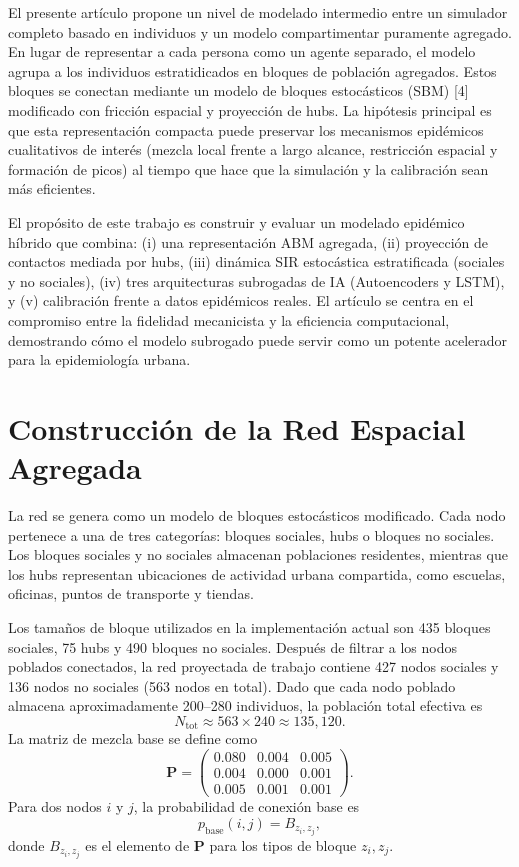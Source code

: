 \documentclass[12pt,a4paper,twocolumn]{article}
\begin{document}
El presente artículo propone un nivel de modelado intermedio entre un simulador completo basado en individuos y un modelo compartimentar puramente agregado. En lugar de representar a cada persona como un agente separado, el modelo agrupa a los individuos estratidicados en bloques de población agregados. Estos bloques se conectan mediante un modelo de bloques estocásticos (SBM) [4] modificado con fricción espacial y proyección de hubs. La hipótesis principal es que esta representación compacta puede preservar los mecanismos epidémicos cualitativos de interés (mezcla local frente a largo alcance, restricción espacial y formación de picos) al tiempo que hace que la simulación y la calibración sean más eficientes.

El propósito de este trabajo es construir y evaluar un modelado epidémico híbrido que combina: (i) una representación ABM agregada, (ii) proyección de contactos mediada por hubs, (iii) dinámica SIR estocástica estratificada (sociales y no sociales), (iv) tres arquitecturas subrogadas de IA (Autoencoders y LSTM), y (v) calibración frente a datos epidémicos reales. El artículo se centra en el compromiso entre la fidelidad mecanicista y la eficiencia computacional, demostrando cómo el modelo subrogado puede servir como un potente acelerador para la epidemiología urbana.

\section*{Construcción de la Red Espacial Agregada}

La red se genera como un modelo de bloques estocásticos modificado. Cada nodo pertenece a una de tres categorías: bloques sociales, hubs o bloques no sociales. Los bloques sociales y no sociales almacenan poblaciones residentes, mientras que los hubs representan ubicaciones de actividad urbana compartida, como escuelas, oficinas, puntos de transporte y tiendas.

Los tamaños de bloque utilizados en la implementación actual son 435 bloques sociales, 75 hubs y 490 bloques no sociales. Después de filtrar a los nodos poblados conectados, la red proyectada de trabajo contiene 427 nodos sociales y 136 nodos no sociales (563 nodos en total). Dado que cada nodo poblado almacena aproximadamente 200--280 individuos, la población total efectiva es
\[
N_{\mathrm{tot}}\approx 563 \times 240 \approx 135{,}120.
\]
La matriz de mezcla base se define como
\[
\mathbf{P}= 
\begin{pmatrix}
0.080 & 0.004 & 0.005\\
0.004 & 0.000 & 0.001\\
0.005 & 0.001 & 0.001
\end{pmatrix}.
\]
Para dos nodos $i$ y $j$, la probabilidad de conexión base es
\[
p_{\mathrm{base}}(i,j)=B_{z_i,z_j},
\]
donde $B_{z_i,z_j}$ es el elemento de $\mathbf{P}$ para los tipos de bloque $z_i, z_j$.
\end{document}
